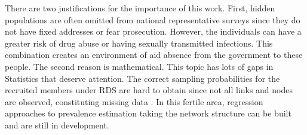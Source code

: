 There are two justifications for the importance of this work. First, hidden
populations are often omitted from national representative surveys since they
do not have fixed addresses or fear prosecution. However, the individuals can
have a greater risk of drug abuse or having sexually transmitted infections.
This combination creates an environment of aid absence from the government to
these people. The second reason is mathematical. This topic has lots of gaps
in Statistics that deserve attention. The correct sampling probabilities for
the recruited members under RDS are hard to obtain since not all links and
nodes are observed, constituting missing data \cite{crawford2016}. In this fertile area,
regression approaches to prevalence estimation taking the network structure
can be built \cite{bastos2012binary} and are still in development.